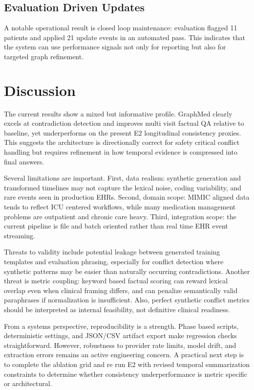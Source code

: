 \documentclass[conference]{IEEEtran}
\begin{document}
\subsection{Evaluation Driven Updates}
A notable operational result is closed loop maintenance: evaluation flagged 11 patients and applied 21 update events in an automated pass. This indicates that the system can use performance signals not only for reporting but also for targeted graph refinement.

\section{Discussion}
The current results show a mixed but informative profile. GraphMed clearly excels at contradiction detection and improves multi visit factual QA relative to baseline, yet underperforms on the present E2 longitudinal consistency proxies. This suggests the architecture is directionally correct for safety critical conflict handling but requires refinement in how temporal evidence is compressed into final answers.

Several limitations are important. First, data realism: synthetic generation and transformed timelines may not capture the lexical noise, coding variability, and rare events seen in production EHRs. Second, domain scope: MIMIC aligned data tends to reflect ICU centered workflows, while many medication management problems are outpatient and chronic care heavy. Third, integration scope: the current pipeline is file and batch oriented rather than real time EHR event streaming.

Threats to validity include potential leakage between generated training templates and evaluation phrasing, especially for conflict detection where synthetic patterns may be easier than naturally occurring contradictions. Another threat is metric coupling: keyword based factual scoring can reward lexical overlap even when clinical framing differs, and can penalize semantically valid paraphrases if normalization is insufficient. Also, perfect synthetic conflict metrics should be interpreted as internal feasibility, not definitive clinical readiness.

From a systems perspective, reproducibility is a strength. Phase based scripts, deterministic settings, and JSON/CSV artifact export make regression checks straightforward. However, robustness to provider rate limits, model drift, and extraction errors remains an active engineering concern. A practical next step is to complete the ablation grid and re run E2 with revised temporal summarization constraints to determine whether consistency underperformance is metric specific or architectural.
\end{document}
